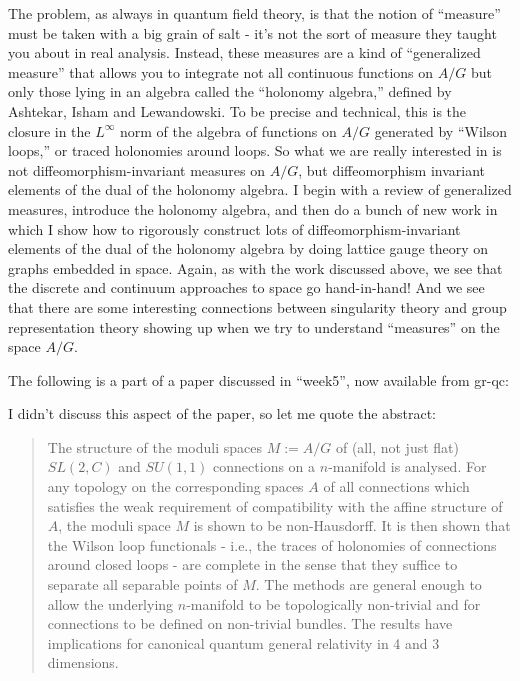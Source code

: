 \documentclass{article}
\def\tightlist{}
\renewcommand{\texttt}[1]{%
  \begingroup
  \ttfamily
  \begingroup\lccode`~=`/\lowercase{\endgroup\def~}{/\discretionary{}{}{}}%
  \begingroup\lccode`~=`[\lowercase{\endgroup\def~}{[\discretionary{}{}{}}%
  \begingroup\lccode`~=`.\lowercase{\endgroup\def~}{.\discretionary{}{}{}}%
  \catcode`/=\active\catcode`[=\active\catcode`.=\active
  \scantokens{#1\noexpand}%
  \endgroup
}
\begin{document}
The problem, as always in quantum field theory, is that the notion of
``measure'' must be taken with a big grain of salt - it's not the sort
of measure they taught you about in real analysis. Instead, these
measures are a kind of ``generalized measure'' that allows you to
integrate not all continuous functions on \(A/G\) but only those lying
in an algebra called the ``holonomy algebra,'' defined by Ashtekar,
Isham and Lewandowski. To be precise and technical, this is the closure
in the \(L^\infty\) norm of the algebra of functions on \(A/G\)
generated by ``Wilson loops,'' or traced holonomies around loops. So
what we are really interested in is not diffeomorphism-invariant
measures on \(A/G\), but diffeomorphism invariant elements of the dual
of the holonomy algebra. I begin with a review of generalized measures,
introduce the holonomy algebra, and then do a bunch of new work in which
I show how to rigorously construct lots of diffeomorphism-invariant
elements of the dual of the holonomy algebra by doing lattice gauge
theory on graphs embedded in space. Again, as with the work discussed
above, we see that the discrete and continuum approaches to space go
hand-in-hand! And we see that there are some interesting connections
between singularity theory and group representation theory showing up
when we try to understand ``measures'' on the space \(A/G\).

The following is a part of a paper discussed in ``week5'', now available
from gr-qc:


I didn't discuss this aspect of the paper, so let me quote the abstract:

\begin{quote}
The structure of the moduli spaces \(M := A/G\) of (all, not just flat)
\(SL(2,C)\) and \(SU(1,1)\) connections on a \(n\)-manifold is analysed.
For any topology on the corresponding spaces \(A\) of all connections
which satisfies the weak requirement of compatibility with the affine
structure of \(A\), the moduli space \(M\) is shown to be non-Hausdorff.
It is then shown that the Wilson loop functionals - i.e., the traces of
holonomies of connections around closed loops - are complete in the
sense that they suffice to separate all separable points of \(M\). The
methods are general enough to allow the underlying \(n\)-manifold to be
topologically non-trivial and for connections to be defined on
non-trivial bundles. The results have implications for canonical quantum
general relativity in 4 and 3 dimensions.
\end{quote}
\end{document}

